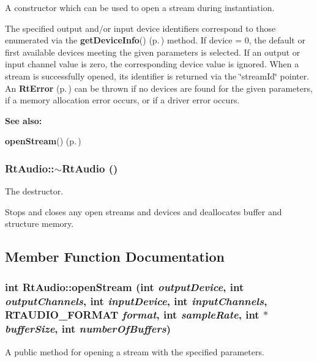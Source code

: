 A constructor which can be used to open a stream during instantiation.

The specified output and/or input device identifiers correspond to those enumerated via the {\bf get\-Device\-Info}() {\rm (p.\,\pageref{classRtAudio_a7})} method. If device = 0, the default or first available devices meeting the given parameters is selected. If an output or input channel value is zero, the corresponding device value is ignored. When a stream is successfully opened, its identifier is returned via the \char`\"{}stream\-Id\char`\"{} pointer. An {\bf Rt\-Error} {\rm (p.\,\pageref{classRtError})} can be thrown if no devices are found for the given parameters, if a memory allocation error occurs, or if a driver error occurs. \begin{Desc}
\item[{\bf See also: }]\par
{\bf open\-Stream}() {\rm (p.\,\pageref{classRtAudio_a3})} \end{Desc}
\subsubsection{\setlength{\rightskip}{0pt plus 5cm}Rt\-Audio::$\sim$Rt\-Audio ()}\label{classRtAudio_a2}


The destructor.

Stops and closes any open streams and devices and deallocates buffer and structure memory. 

\subsection{Member Function Documentation}
\subsubsection{\setlength{\rightskip}{0pt plus 5cm}int Rt\-Audio::open\-Stream (int {\em output\-Device}, int {\em output\-Channels}, int {\em input\-Device}, int {\em input\-Channels}, {\bf RTAUDIO\_\-FORMAT} {\em format}, int {\em sample\-Rate}, int $\ast$ {\em buffer\-Size}, int {\em number\-Of\-Buffers})}\label{classRtAudio_a3}


A public method for opening a stream with the specified parameters.

